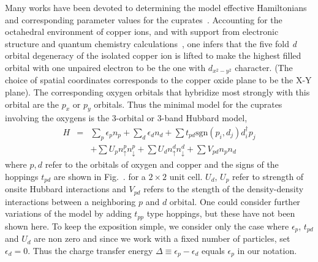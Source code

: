 \documentclass[prl,12pt,onecolumn,nofootinbib,notitlepage,english,superscriptaddress]{revtex4-1}
\begin{document}
Many works have been devoted to determining the model effective Hamiltonians and corresponding parameter 
values for the cuprates~\cite{Emery, Rice, tJSpalek, Hybertsen_PRB1989, Hybertsen_PRB1990, Pavirini, Kent_Hubbard}. 
Accounting for the octahedral environment of copper ions, and with support from electronic structure 
and quantum chemistry calculations~\cite{Dagotto_RevModPhys}, one infers 
that the five fold \emph{d} orbital degeneracy of the isolated copper ion is lifted to make the 
highest filled orbital with one unpaired electron to be the one with $d_{x^2-y^2}$ character. 
(The choice of spatial coordinates corresponds to the copper oxide plane to be the X-Y plane). 
The corresponding oxygen orbitals that hybridize most strongly with this orbital are the $p_x$ or $p_y$ orbitals. 
Thus the minimal model for the cuprates involving the oxygens 
is the 3-orbital or 3-band Hubbard model, 
\begin{eqnarray}
H &=&    \sum_{p} \epsilon_p n_p + \sum_{d} \epsilon_d n_d + \sum t_{pd} \text{sgn}(p_i,d_j) d_i^{\dagger} p_j \\
  & &  + \sum U_p n^{p}_{\uparrow} n^{p}_{\downarrow} + \sum U_d n^{d}_{\uparrow} n^{d}_{\downarrow} + \sum V_{pd} n_p n_d 
\end{eqnarray}
where $p,d$ refer to the orbitals of oxygen and copper and the signs of the hoppings $t_{pd}$ are 
shown in Fig.~. for a $2 \times 2$ unit cell. $U_d$, $U_p$ refer to strength of onsite Hubbard 
interactions and $V_{pd}$ refers to the stength of the density-density interactions between a neighboring 
$p$ and $d$ orbital. One could consider further variations of the model by adding $t_{pp}$ type hoppings, but 
these have not been shown here. To keep the exposition simple, we consider only 
the case where $\epsilon_p$, $t_{pd}$ and $U_{d}$ are non zero and 
since we work with a fixed number of particles, set $\epsilon_d = 0$. Thus the 
charge transfer energy $\Delta \equiv \epsilon_p - \epsilon_d$ equals $\epsilon_p$ in our notation. 
\end{document}

